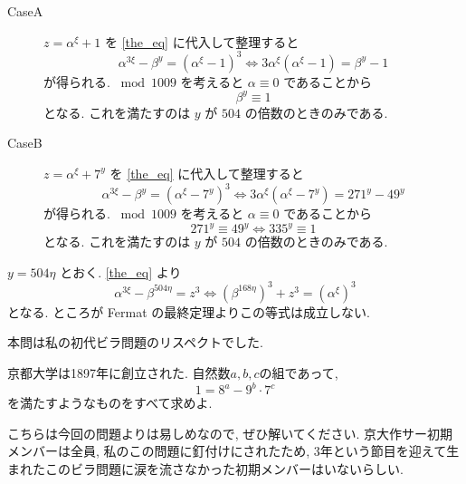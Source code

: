    \begin{description}
      \item[CaseA] $z = \alpha^{\xi} + 1$ を
      \eqref{the_eq} に代入して整理すると
      \[
        \alpha^{3\xi} - \beta^{y} = (\alpha^{\xi} - 1)^{3}
        \iff
        3 \alpha^{\xi} (\alpha^{\xi} - 1) = \beta^{y} - 1
      \]
      が得られる. ${}\bmod{1009}$ を考えると
      $\alpha \equiv 0$ であることから
      \[
        \beta^{y} \equiv 1
      \]
      となる. これを満たすのは $y$ が $504$ の倍数のときのみである.
      \item[CaseB] $z = \alpha^{\xi} + 7^{y}$ を
      \eqref{the_eq} に代入して整理すると
      \[
        \alpha^{3\xi} - \beta^{y} = (\alpha^{\xi} - 7^{y})^{3}
        \iff
        3 \alpha^{\xi} (\alpha^{\xi} - 7^{y})
        = 271^{y} - 49^{y}
      \]
      が得られる. ${}\bmod{1009}$ を考えると
      $\alpha \equiv 0$ であることから
      \[
        271^{y} \equiv 49^{y}
        \iff
        335^{y} \equiv 1
      \]
      となる. これを満たすのは $y$ が $504$ の倍数のときのみである.
    \end{description}
    $y = 504 \eta$ とおく. \eqref{the_eq} より
    \[
      \alpha^{3 \xi} - \beta^{504 \eta} = z^{3}
      \iff
      (\beta^{168 \eta})^{3} + z^{3} = (\alpha^{\xi})^{3}
    \]
    となる. ところが Fermat の最終定理よりこの等式は成立しない.
 

本問は私の初代ビラ問題のリスペクトでした. 
\begin{tcolorbox}[title= 初代ビラ問題]
京都大学は1897年に創立された. 自然数$a,b,c$の組であって, 
\[1=8^{a}-9^{b}\cdot 7^{c}\]
を満たすようなものをすべて求めよ.
\end{tcolorbox}
こちらは今回の問題よりは易しめなので, ぜひ解いてください. 京大作サー初期メンバーは全員, 私のこの問題に釘付けにされたため, 3年という節目を迎えて生まれたこのビラ問題に涙を流さなかった初期メンバーはいないらしい.

